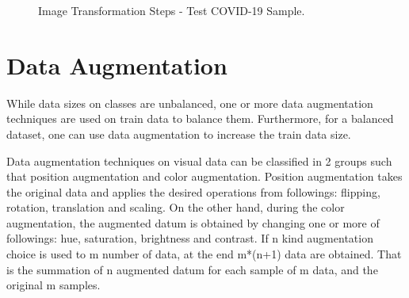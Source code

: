 \begin{figure}[h]
	\centering
	\caption{Image Transformation Steps - Test COVID-19 Sample.}
	\label{data_transform_steps}
\end{figure}

\section{Data Augmentation}

While data sizes on classes are unbalanced, one or more data augmentation techniques are used on train data to balance them. Furthermore, for a balanced dataset, one can use data augmentation to increase the train data size.

Data augmentation techniques on visual data can be classified in 2 groups such that position augmentation and color augmentation. Position augmentation takes the original data and applies the desired operations from followings: flipping, rotation, translation and scaling. On the other hand, during the color augmentation, the augmented datum is obtained by changing one or more of followings: hue, saturation, brightness and contrast. If n kind augmentation choice is used to m number of data, at the end m*(n+1) data are obtained. That is the summation of n augmented datum for each sample of m data, and the original m samples.


